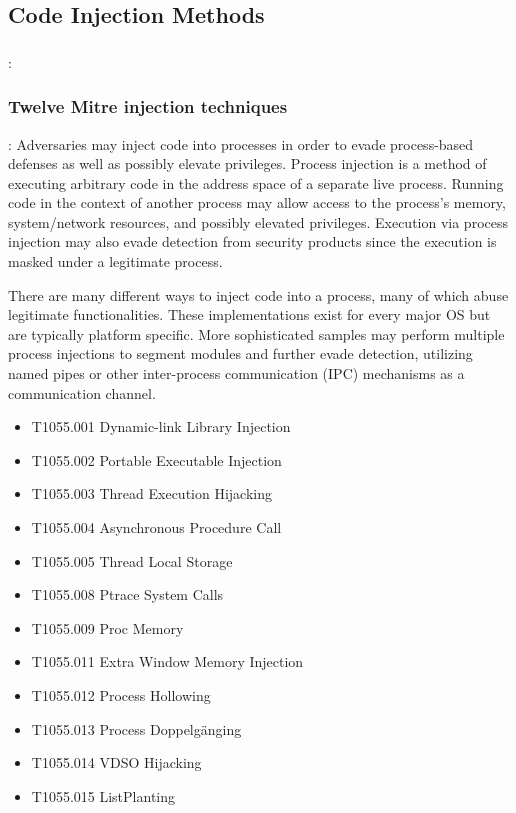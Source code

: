 \documentclass{article}
\begin{document}
\subsection{Code Injection Methods}

\subsubsection{\textcite{Oosthoek:2019}}
\textbf{}: 


\subsubsection{\textcite{Mitre:2017} Twelve Mitre injection techniques}
\textbf{}: Adversaries may inject code into processes in order to evade process-based defenses as well as possibly elevate privileges. Process injection is a method of executing arbitrary code in the address space of a separate live process. Running code in the context of another process may allow access to the process's memory, system/network resources, and possibly elevated privileges. Execution via process injection may also evade detection from security products since the execution is masked under a legitimate process. 

There are many different ways to inject code into a process, many of which abuse legitimate functionalities. These implementations exist for every major OS but are typically platform specific. 
More sophisticated samples may perform multiple process injections to segment modules and further evade detection, utilizing named pipes or other inter-process communication (IPC) mechanisms as a communication channel. 

\begin{itemize}
\item T1055.001	Dynamic-link Library Injection
\item T1055.002	Portable Executable Injection
\item T1055.003	Thread Execution Hijacking
\item T1055.004	Asynchronous Procedure Call
\item T1055.005	Thread Local Storage
\item T1055.008	Ptrace System Calls
\item T1055.009	Proc Memory
\item T1055.011	Extra Window Memory Injection
\item T1055.012	Process Hollowing
\item T1055.013	Process Doppelgänging
\item T1055.014	VDSO Hijacking
\item T1055.015	ListPlanting
\end{itemize}
\end{document}

